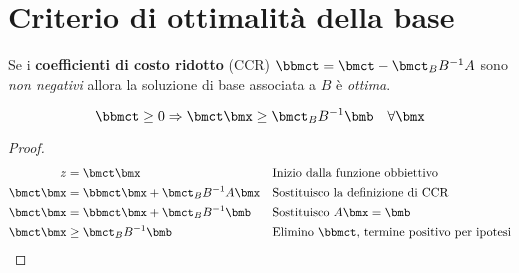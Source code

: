 \documentclass[\main/main.tex]{subfiles}
\begin{document}
\section{Criterio di ottimalità della base}
\begin{theorem}
  Se i \textbf{coefficienti di costo ridotto} (CCR) $\bbmct = \bmct - \bmct_B B^{-1} A$ sono \textit{non negativi} allora la soluzione di base associata a $B$ è \textit{ottima}.

  \[
    \bbmct \geq 0 \Rightarrow \bmct \bmx \geq \bmct_B B^{-1}\bmb \quad \forall \bmx
  \]
\end{theorem}


\begin{proof}
  \begin{align*}
    z          & =\bmct \bmx                         &  & \text{Inizio dalla funzione obbiettivo}               \\
    \bmct \bmx & = \bbmct\bmx + \bmct_B B^{-1} A\bmx &  & \text{Sostituisco la definizione di CCR}              \\
    \bmct \bmx & = \bbmct\bmx + \bmct_B B^{-1} \bmb  &  & \text{Sostituisco $A\bmx = \bmb$}                     \\
    \bmct \bmx & \geq \bmct_B B^{-1} \bmb            &  & \text{Elimino $\bbmct$, termine positivo per ipotesi}
  \end{align*}
\end{proof}
\end{document}
